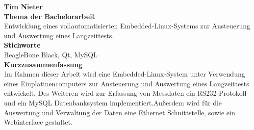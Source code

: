 
\thispagestyle{empty}


{\large \textbf{Tim Nieter}}\\

{\large \textbf{Thema der Bachelorarbeit}}\\
Entwicklung eines vollautomatisierten Embedded-Linux-Systems zur Ansteuerung und Auswertung eines Langzeittests.\\

{\large \textbf{Stichworte}}\\
BeagleBone Black, Qt, MySQL\\

{\large \textbf{Kurzzusammenfassung}}\\
Im Rahmen dieser Arbeit wird eine Embedded-Linux-System unter Verwendung eines Einplatinencomputers zur Ansteuerung und Auswertung eines Langzeittests entwickelt. Des Weiteren wird zur Erfassung von Messdaten ein RS232 Protokoll und ein MySQL Datenbanksystem implementiert.Außerdem wird für die Auswertung und Verwaltung der Daten eine Ethernet Schnittstelle, sowie ein Webinterface gestaltet.